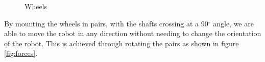 \begin{figure}[htp]
	\centering
	\hspace{0.2\textwidth}
	\caption{Wheels}
	\label{fig:wheels}
\end{figure}
By mounting the wheels in pairs, with the shafts crossing at a 90$^\circ$ angle, we are able to 
move the robot in any direction without needing to change the orientation of the robot.
This is achieved through rotating the pairs as shown in figure \ref{fig:forces}.
